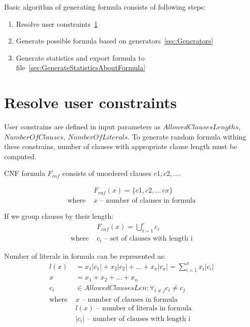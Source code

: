 Basic algorithm of generating formula consists of following steps:

\begin{enumerate}
  \item Resolve user constraints~\ref{sec:ResolveUserConstrains}
  \item Generate possible formula based on generators~\ref{sec:Generators}
  \item Generate statistics and export formula to file~\ref{sec:GenerateStatisticsAboutFormula}
\end{enumerate}


\section{Resolve user constraints}
\label{sec:ResolveUserConstrains}

User constrains are defined in input parameters as $AllowedClausesLengths$, $NumberOfClauses$, $NumberOfLiterals$. To generate random formula withing these constrains, number of clauses with appropriate clause length must be computed.

CNF formula $F_{cnf}$ consists of unordered clauses $c1, c2, \dots$. 

\begin{align*}
	&F_{cnf}(x) = \{c1, c2, \dots\, cx\} \\
	\text{where }
		&x \text{ -- number of clauses in formula}
\end{align*}

If we group clauses by their length:
\begin{align*}
	&F_{cnf}(x) = \bigcup_{i=1}^c c_i \\
	\text{where }
		&c_i \text{ -- set of clauses with length i} 
\end{align*}

Number of literals in formula can be represented as:
\begin{align*}
	l(x) &= x_1|c_1| + x_2|c_2| + \dots + x_x|c_x| = \sum_{i=1}^{x} x_i |c_i| \\
	x &= x_1 + x_2 + \dots + x_n \\
	c_i &\in AllowedClausesLen: \forall_{i \neq j} c_i \neq c_j  \\
	\text{where }
		&x \text{ -- number of clauses in formula} \\ 
		&l(x) \text{ -- number of literals in formula} \\ 
		&|c_i| \text{ -- number of clauses with length i} 
\end{align*}

